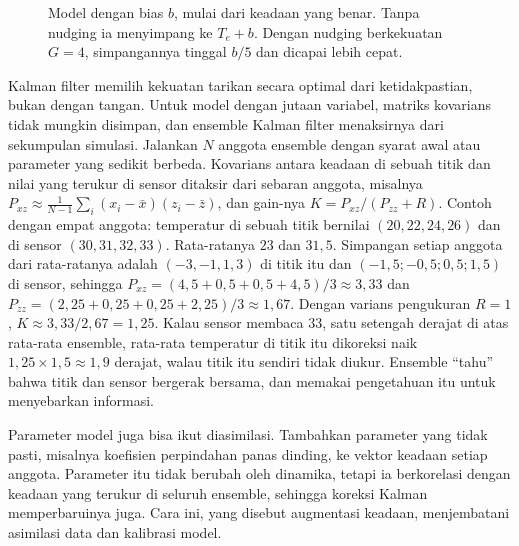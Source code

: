 \begin{figure}[ht]
\centering
{}
\caption{Model dengan bias $b$, mulai dari keadaan yang benar. Tanpa nudging ia menyimpang ke $T_e+b$. Dengan nudging
berkekuatan $G=4$, simpangannya tinggal $b/5$ dan dicapai lebih cepat.}
\label{fig:nudging}
\end{figure}

Kalman filter memilih kekuatan tarikan secara optimal dari ketidakpastian, bukan dengan tangan. Untuk model dengan
jutaan variabel, matriks kovarians tidak mungkin disimpan, dan ensemble Kalman filter \citep{evensen1994} menaksirnya dari
sekumpulan simulasi. Jalankan $N$ anggota ensemble dengan syarat awal atau parameter yang sedikit berbeda. Kovarians
antara keadaan di sebuah titik dan nilai yang terukur di sensor ditaksir dari sebaran anggota, misalnya
$P_{xz}\approx\frac1{N-1}\sum_i(x_i-\bar x)(z_i-\bar z)$, dan gain-nya $K=P_{xz}/(P_{zz}+R)$. Contoh dengan empat anggota:
temperatur di sebuah titik bernilai $(20,22,24,26)$ dan di sensor $(30,31,32,33)$. Rata-ratanya $23$ dan $31{,}5$. Simpangan setiap anggota dari rata-ratanya adalah
$(-3,-1,1,3)$ di titik itu dan $(-1{,}5;-0{,}5;0{,}5;1{,}5)$ di sensor, sehingga $P_{xz}=(4{,}5+0{,}5+0{,}5+4{,}5)/3\approx3{,}33$ dan
$P_{zz}=(2{,}25+0{,}25+0{,}25+2{,}25)/3\approx1{,}67$. Dengan varians pengukuran $R=1$, $K\approx3{,}33/2{,}67=1{,}25$. Kalau
sensor membaca $33$, satu setengah derajat di atas rata-rata ensemble, rata-rata temperatur di titik itu dikoreksi naik
$1{,}25\times1{,}5\approx1{,}9$ derajat, walau titik itu sendiri tidak diukur. Ensemble ``tahu'' bahwa titik dan sensor
bergerak bersama, dan memakai pengetahuan itu untuk menyebarkan informasi.

Parameter model juga bisa ikut diasimilasi. Tambahkan parameter yang tidak pasti, misalnya koefisien perpindahan panas
dinding, ke vektor keadaan setiap anggota. Parameter itu tidak berubah oleh dinamika, tetapi ia berkorelasi dengan
keadaan yang terukur di seluruh ensemble, sehingga koreksi Kalman memperbaruinya juga. Cara ini, yang disebut augmentasi
keadaan, menjembatani asimilasi data dan kalibrasi model.


